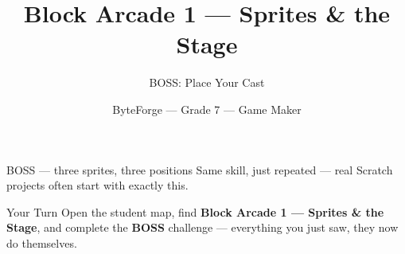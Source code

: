 \documentclass[aspectratio=169]{beamer}
\title{Block Arcade 1 — Sprites \& the Stage}
\subtitle{BOSS: Place Your Cast}
\author{ByteForge --- Grade 7 --- Game Maker}
\date{}
\begin{document}
\begin{frame}
    \titlepage
\end{frame}

\begin{frame}{BOSS — three sprites, three positions}
    \Large
    Same skill, just repeated — real Scratch projects often start with exactly this.
\end{frame}

\begin{frame}{Your Turn}
    \Large
    Open the student map, find \textbf{Block Arcade 1 — Sprites \& the Stage}, and complete
    the \textbf{BOSS} challenge --- everything you just saw, they now do themselves.
\end{frame}
\end{document}
